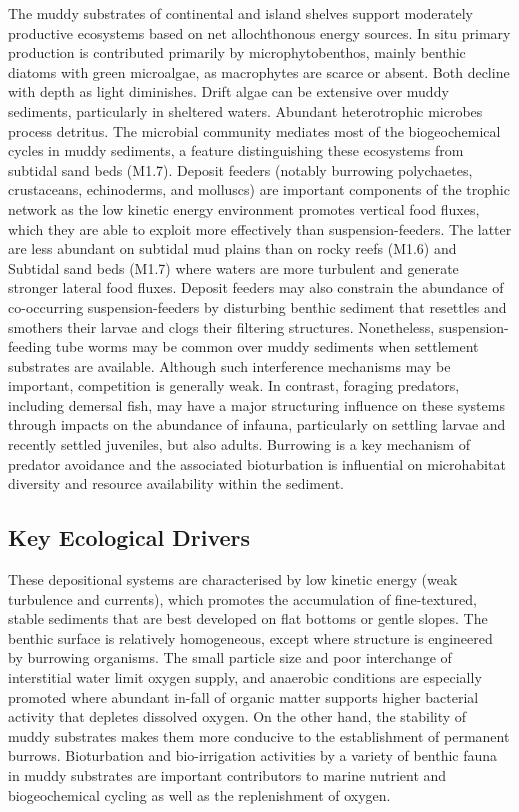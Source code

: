\documentclass[
  letterpaper,
  DIV=11,
  numbers=noendperiod]{scrartcl}
\begin{document}
The muddy substrates of continental and island shelves support
moderately productive ecosystems based on net allochthonous energy
sources. In situ primary production is contributed primarily by
microphytobenthos, mainly benthic diatoms with green microalgae, as
macrophytes are scarce or absent. Both decline with depth as light
diminishes. Drift algae can be extensive over muddy sediments,
particularly in sheltered waters. Abundant heterotrophic microbes
process detritus. The microbial community mediates most of the
biogeochemical cycles in muddy sediments, a feature distinguishing these
ecosystems from subtidal sand beds (M1.7). Deposit feeders (notably
burrowing polychaetes, crustaceans, echinoderms, and molluscs) are
important components of the trophic network as the low kinetic energy
environment promotes vertical food fluxes, which they are able to
exploit more effectively than suspension-feeders. The latter are less
abundant on subtidal mud plains than on rocky reefs (M1.6) and Subtidal
sand beds (M1.7) where waters are more turbulent and generate stronger
lateral food fluxes. Deposit feeders may also constrain the abundance of
co-occurring suspension-feeders by disturbing benthic sediment that
resettles and smothers their larvae and clogs their filtering
structures. Nonetheless, suspension-feeding tube worms may be common
over muddy sediments when settlement substrates are available. Although
such interference mechanisms may be important, competition is generally
weak. In contrast, foraging predators, including demersal fish, may have
a major structuring influence on these systems through impacts on the
abundance of infauna, particularly on settling larvae and recently
settled juveniles, but also adults. Burrowing is a key mechanism of
predator avoidance and the associated bioturbation is influential on
microhabitat diversity and resource availability within the sediment.

\subsection{Key Ecological Drivers}\label{key-ecological-drivers-33}

These depositional systems are characterised by low kinetic energy (weak
turbulence and currents), which promotes the accumulation of
fine-textured, stable sediments that are best developed on flat bottoms
or gentle slopes. The benthic surface is relatively homogeneous, except
where structure is engineered by burrowing organisms. The small particle
size and poor interchange of interstitial water limit oxygen supply, and
anaerobic conditions are especially promoted where abundant in-fall of
organic matter supports higher bacterial activity that depletes
dissolved oxygen. On the other hand, the stability of muddy substrates
makes them more conducive to the establishment of permanent burrows.
Bioturbation and bio-irrigation activities by a variety of benthic fauna
in muddy substrates are important contributors to marine nutrient and
biogeochemical cycling as well as the replenishment of oxygen.
\end{document}
